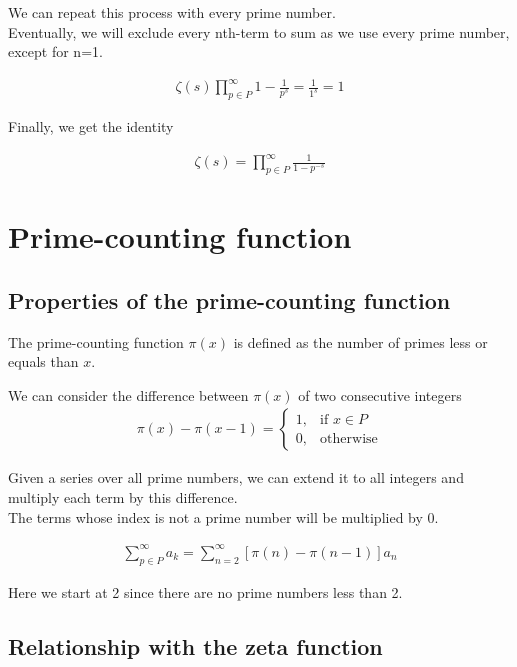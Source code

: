 \documentclass{article}
\begin{document}
We can repeat this process with every prime number.
\\
Eventually, we will exclude every nth-term to sum as we use every prime number, except for n=1.

\begin{align*}
    \zeta(s)\prod_{p\in P}^{\infty}1-\frac{1}{p^s}=\frac{1}{1^s}=1
\end{align*}

Finally, we get the identity

\begin{align*}
    \zeta(s)=
    \prod_{p\in P}^{\infty}\frac{1}{1-p^{-s}}
\end{align*}

\pagebreak

\section{Prime-counting function}

\subsection{Properties of the prime-counting function}

The prime-counting function $\pi (x)$ is defined as the number of primes less or equals than $x$.

We can consider the difference between $\pi (x)$ of two consecutive integers
\begin{align*}
    \pi (x)-\pi (x-1)= 
    \begin{cases}
        1,& \text{if } x\in P
        \\
        0,& \text{otherwise}
    \end{cases}
\end{align*}

Given a series over all prime numbers, we can extend it to all integers and multiply each term by this difference.
\\
The terms whose index is not a prime number will be multiplied by 0.

\begin{align*}
    \sum_{p\in P}^{\infty}a_k=\sum_{n=2}^{\infty}\left[\pi (n) - \pi (n-1)\right]a_n
\end{align*}

Here we start at 2 since there are no prime numbers less than 2.

\subsection{Relationship with the zeta function}
\end{document}
